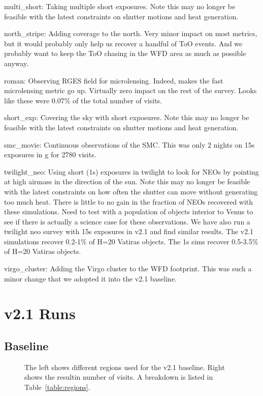 multi\_short:  Taking multiple short exposures. Note this may no longer be feasible with the latest constraints on shutter motions and heat generation.

north\_stripe:  Adding coverage to the north. Very minor impact on most metrics, but it would probably only help us recover a handful of ToO events. And we probably want to keep the ToO chasing in the WFD area as much as possible anyway.

roman: Observing RGES field for microlensing. Indeed, makes the fast microlensing metric go up. Virtually zero impact on the rest of the survey. Looks like these were 0.07\% of the total number of visits. 

short\_exp: Covering the sky with short exposures. Note this may no longer be feasible with the latest constraints on shutter motions and heat generation.

smc\_movie: Continuous observations of the SMC. This was only 2 nights on 15s exposures in g for 2780 visits. 

twilight\_neo:  Using short (1s) exposures in twilight to look for NEOs by pointing at high airmass in the direction of the sun. Note this may no longer be feasible with the latest constraints on how often the shutter can move without generating too much heat. There is little to no gain in the fraction of NEOs recovered with these simulations. Need to test with a population of objects interior to Venus to see if there is actually a science case for these observations.  We have also run a twilight neo survey with 15s exposures in v2.1 and find similar results. The v2.1 simulations recover 0.2-1\% of H=20 Vatiras objects. The 1s sims recover 0.5-3.5\% of H=20 Vatiras objects.

virgo\_cluster:  Adding the Virgo cluster to the WFD footprint. This was such a minor change that we adopted it into the v2.1 baseline.


\section{v2.1 Runs}

\subsection{Baseline}

\begin{figure}
\caption{The left shows different regions used for the v2.1 baseline. Right shows the resultin number of visits. A breakdown is listed in Table~\ref{table:regions}.}
\end{figure}

